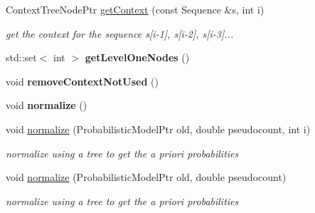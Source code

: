 \begin{DoxyCompactItemize}
\item 
\mbox{\label{classtops_1_1ContextTree_ad17e69f26c0a150f712095ece88ea297}} 
Context\+Tree\+Node\+Ptr \hyperlink{classtops_1_1ContextTree_ad17e69f26c0a150f712095ece88ea297}{get\+Context} (const Sequence \&s, int i)
\begin{DoxyCompactList}\small\item\em get the context for the sequence s\mbox{[}i-\/1\mbox{]}, s\mbox{[}i-\/2\mbox{]}, s\mbox{[}i-\/3\mbox{]}... \end{DoxyCompactList}\item 
\mbox{\label{classtops_1_1ContextTree_a52a84ec42ab07a959dc5812a51bbe049}} 
std\+::set$<$ int $>$ {\bfseries get\+Level\+One\+Nodes} ()
\item 
\mbox{\label{classtops_1_1ContextTree_a89f848bdf5f306c5208f5404fa3c33c3}} 
void {\bfseries remove\+Context\+Not\+Used} ()
\item 
\mbox{\label{classtops_1_1ContextTree_a095e0afc432dfe200e79fe5eaa7262fa}} 
void {\bfseries normalize} ()
\item 
\mbox{\label{classtops_1_1ContextTree_aaf2c8624acd71a9c77bd2873fc7a6160}} 
void \hyperlink{classtops_1_1ContextTree_aaf2c8624acd71a9c77bd2873fc7a6160}{normalize} (Probabilistic\+Model\+Ptr old, double pseudocount, int i)
\begin{DoxyCompactList}\small\item\em normalize using a tree to get the a priori probabilities \end{DoxyCompactList}\item 
\mbox{\label{classtops_1_1ContextTree_adcc817708230cc1d86b5f8447a57bee9}} 
void \hyperlink{classtops_1_1ContextTree_adcc817708230cc1d86b5f8447a57bee9}{normalize} (Probabilistic\+Model\+Ptr old, double pseudocount)
\begin{DoxyCompactList}\small\item\em normalize using a tree to get the a priori probabilities \end{DoxyCompactList}\item 
\mbox{\label{classtops_1_1ContextTree_a56a7adedc56ab527743ebdef0c479fa7}} 

\end{DoxyCompactItemize}
